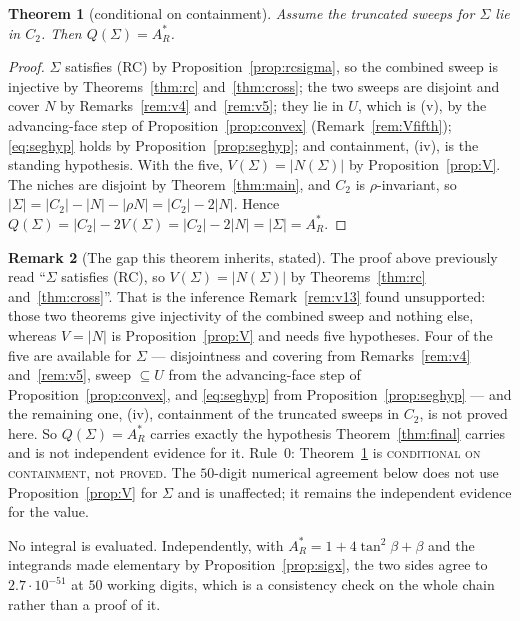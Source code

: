 \documentclass[11pt]{article}
\newtheorem{theorem}{Theorem}
\theoremstyle{definition}
\newtheorem{remark}[theorem]{Remark}
\newcommand{\Sig}{\Sigma}
\begin{document}
\begin{theorem}[conditional on containment]\label{thm:QA}
Assume the truncated sweeps for $\Sig$ lie in $C_2$. Then $Q(\Sig)=A_R^\ast$.
\end{theorem}

\begin{proof}
$\Sig$ satisfies (RC) by Proposition~\ref{prop:rcsigma}, so the combined sweep is injective
by Theorems~\ref{thm:rc} and~\ref{thm:cross}; the two sweeps are disjoint and cover $N$ by
Remarks~\ref{rem:v4} and~\ref{rem:v5}; they lie in $U$, which is (v), by the advancing-face
step of Proposition~\ref{prop:convex} (Remark~\ref{rem:Vfifth}); \eqref{eq:seghyp} holds by
Proposition~\ref{prop:seghyp}; and containment, (iv), is the standing hypothesis. With the
five, $V(\Sig)=|N(\Sig)|$ by Proposition~\ref{prop:V}. The niches are disjoint by
Theorem~\ref{thm:main}, and $C_2$ is $\rho$-invariant, so
$|\Sig|=|C_2|-|N|-|\rho N|=|C_2|-2|N|$. Hence
$Q(\Sig)=|C_2|-2V(\Sig)=|C_2|-2|N|=|\Sig|=A_R^\ast$.
\end{proof}

\begin{remark}[The gap this theorem inherits, stated]\label{rem:QAgap}
The proof above previously read ``$\Sig$ satisfies (RC), so $V(\Sig)=|N(\Sig)|$ by
Theorems~\ref{thm:rc} and~\ref{thm:cross}''. That is the inference Remark~\ref{rem:v13}
found unsupported: those two theorems give injectivity of the combined sweep and nothing
else, whereas $V=|N|$ is Proposition~\ref{prop:V} and needs five hypotheses. Four of the
five are available for $\Sig$ --- disjointness and covering from Remarks~\ref{rem:v4}
and~\ref{rem:v5}, sweep $\subseteq U$ from the advancing-face step of
Proposition~\ref{prop:convex}, and \eqref{eq:seghyp} from Proposition~\ref{prop:seghyp} ---
and the remaining one, (iv), containment of the truncated sweeps in $C_2$, is not proved
here. So $Q(\Sig)=A_R^\ast$
carries exactly the hypothesis Theorem~\ref{thm:final} carries and is not independent
evidence for it. Rule~0: Theorem~\ref{thm:QA} is \textsc{conditional on containment}, not
\textsc{proved}. The $50$-digit numerical agreement below does not use
Proposition~\ref{prop:V} for $\Sig$ and is unaffected; it remains the independent evidence
for the value.
\end{remark}

No integral is evaluated. Independently, with $A_R^\ast=1+4\tan^2\beta+\beta$ and the
integrands made elementary by Proposition~\ref{prop:sigx}, the two sides agree to
$2.7\cdot10^{-51}$ at $50$ working digits, which is a consistency check on the whole
chain rather than a proof of it.
\end{document}
